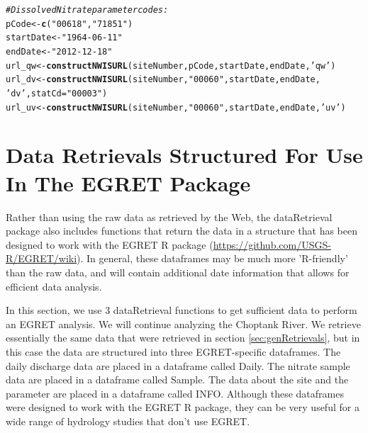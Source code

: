 \documentclass[a4paper,11pt]{article}\usepackage[]{graphicx}\usepackage[]{color}
\makeatletter
\newcommand{\hlstr}[1]{\textcolor[rgb]{0.192,0.494,0.8}{#1}}%
\newcommand{\hlcom}[1]{\textcolor[rgb]{0.678,0.584,0.686}{\textit{#1}}}%
\newcommand{\hlstd}[1]{\textcolor[rgb]{0.345,0.345,0.345}{#1}}%
\newcommand{\hlkwb}[1]{\textcolor[rgb]{0.69,0.353,0.396}{#1}}%
\newcommand{\hlkwc}[1]{\textcolor[rgb]{0.333,0.667,0.333}{#1}}%
\newcommand{\hlkwd}[1]{\textcolor[rgb]{0.737,0.353,0.396}{\textbf{#1}}}%
\newenvironment{kframe}{%
 \def\at@end@of@kframe{}%
 \ifinner\ifhmode%
  \def\at@end@of@kframe{\end{minipage}}%
  \begin{minipage}{\columnwidth}%
 \fi\fi%
 \def\FrameCommand##1{\hskip\@totalleftmargin \hskip-\fboxsep
 \colorbox{shadecolor}{##1}\hskip-\fboxsep
     \hskip-\linewidth \hskip-\@totalleftmargin \hskip\columnwidth}%
 \MakeFramed {\advance\hsize-\width
   \@totalleftmargin\z@ \linewidth\hsize
   \@setminipage}}%
 {\par\unskip\endMakeFramed%
 \at@end@of@kframe}
\newenvironment{knitrout}{}{} %
\makeatother
\begin{document}
\begin{knitrout}
\color{fgcolor}\begin{kframe}
\begin{alltt}
\hlcom{# Dissolved Nitrate parameter codes:}
\hlstd{pCode} \hlkwb{<-} \hlkwd{c}\hlstd{(}\hlstr{"00618"}\hlstd{,}\hlstr{"71851"}\hlstd{)}
\hlstd{startDate} \hlkwb{<-} \hlstr{"1964-06-11"}
\hlstd{endDate} \hlkwb{<-} \hlstr{"2012-12-18"}
\hlstd{url_qw} \hlkwb{<-} \hlkwd{constructNWISURL}\hlstd{(siteNumber,pCode,startDate,endDate,}\hlstr{'qw'}\hlstd{)}
\hlstd{url_dv} \hlkwb{<-} \hlkwd{constructNWISURL}\hlstd{(siteNumber,}\hlstr{"00060"}\hlstd{,startDate,endDate,}
                           \hlstr{'dv'}\hlstd{,}\hlkwc{statCd}\hlstd{=}\hlstr{"00003"}\hlstd{)}
\hlstd{url_uv} \hlkwb{<-} \hlkwd{constructNWISURL}\hlstd{(siteNumber,}\hlstr{"00060"}\hlstd{,startDate,endDate,}\hlstr{'uv'}\hlstd{)}
\end{alltt}
\end{kframe}
\end{knitrout}

\FloatBarrier

\section{Data Retrievals Structured For Use In The EGRET Package}
\label{sec:EGRETdfs}
Rather than using the raw data as retrieved by the Web, the dataRetrieval package also includes functions that return the data in a structure that has been designed to work with the EGRET R package (\url{https://github.com/USGS-R/EGRET/wiki}). In general, these dataframes may be much more 'R-friendly' than the raw data, and will contain additional date information that allows for efficient data analysis.

In this section, we use 3 dataRetrieval functions to get sufficient data to perform an EGRET analysis.  We will continue analyzing the Choptank River. We retrieve essentially the same data that were retrieved in section \ref{sec:genRetrievals}, but in this case the data are structured into three EGRET-specific dataframes.  The daily discharge data are placed in a dataframe called Daily.  The nitrate sample data are placed in a dataframe called Sample.  The data about the site and the parameter are placed in a dataframe called INFO.  Although these dataframes were designed to work with the EGRET R package, they can be very useful for a wide range of hydrology studies that don't use EGRET.
\end{document}
